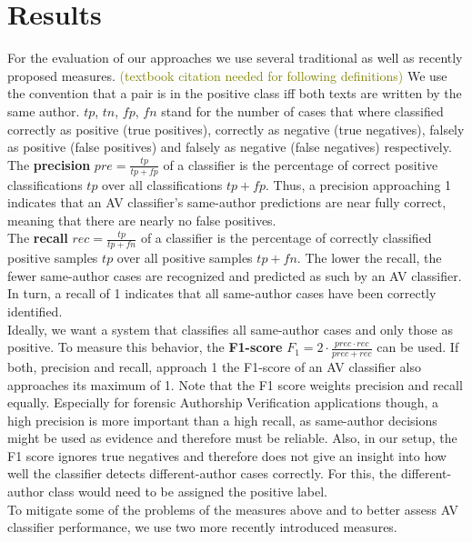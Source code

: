 \chapter{Results}\label{results}
For the evaluation of our approaches we use several traditional as well as recently proposed measures.
\textcolor{olive}{(textbook citation needed for following definitions)} We use the convention that a pair is in the positive class iff both texts are written by the same author.
$tp$, $tn$, $fp$, $fn$ stand for the number of cases that where classified correctly as positive (true positives), correctly as negative (true negatives), falsely as positive (false positives) and falsely as negative (false negatives) respectively.\\
The \textbf{precision} $pre = \frac{tp}{tp+fp}$ of a classifier is the percentage of correct positive classifications $tp$ over all classifications $tp+fp$.
Thus, a precision approaching 1 indicates that an AV classifier's same-author predictions are near fully correct, meaning that there are nearly no false positives.\\
The \textbf{recall} $rec = \frac{tp}{tp+fn}$ of a classifier is the percentage of correctly classified positive samples $tp$ over all positive samples $tp+fn$.
The lower the recall, the fewer same-author cases are recognized and predicted as such by an AV classifier.
In turn, a recall of 1 indicates that all same-author cases have been correctly identified.\\
Ideally, we want a system that classifies all same-author cases and only those as positive.
To measure this behavior, the \textbf{F1-score} $F_1 = 2\cdot\frac{prec\cdot{}rec}{prec+rec}$ can be used.
If both, precision and recall, approach 1 the F1-score of an AV classifier also approaches its maximum of 1.
Note that the F1 score weights precision and recall equally.
Especially for forensic Authorship Verification applications though, a high precision is more important than a high recall, as same-author decisions might be used as evidence and therefore must be reliable.
Also, in our setup, the F1 score ignores true negatives and therefore does not give an insight into how well the classifier detects different-author cases correctly.
For this, the different-author class would need to be assigned the positive label.\\
To mitigate some of the problems of the measures above and to better assess AV classifier performance, we use two more recently introduced measures.
